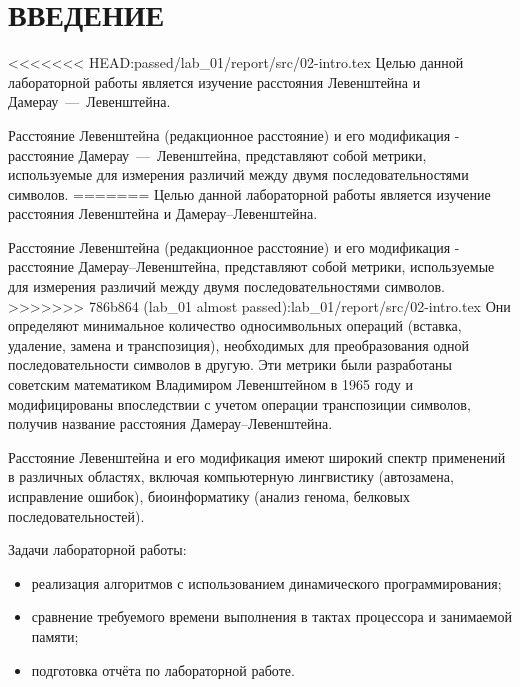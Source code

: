 \section*{ВВЕДЕНИЕ}

<<<<<<< HEAD:passed/lab_01/report/src/02-intro.tex
Целью данной лабораторной работы является изучение расстояния Левенштейна и Дамерау~---~Левенштейна.

Расстояние Левенштейна (редакционное расстояние) и его модификация - расстояние Дамерау~---~Левенштейна, представляют собой метрики, используемые для измерения различий между двумя последовательностями символов.
=======
Целью данной лабораторной работы является изучение расстояния Левенштейна и Дамерау--Левенштейна.

Расстояние Левенштейна (редакционное расстояние) и его модификация - расстояние Дамерау--Левенштейна, представляют собой метрики, используемые для измерения различий между двумя последовательностями символов.
>>>>>>> 786b864 (lab_01 almost passed):lab_01/report/src/02-intro.tex
Они определяют минимальное количество односимвольных операций (вставка, удаление, замена и транспозиция), необходимых для преобразования одной последовательности символов в другую.
Эти метрики были разработаны советским математиком Владимиром Левенштейном в 1965 году и модифицированы впоследствии с учетом операции транспозиции символов, получив название расстояния Дамерау--Левенштейна.

Расстояние Левенштейна и его модификация имеют широкий спектр применений в различных областях, включая компьютерную лингвистику (автозамена, исправление ошибок), биоинформатику (анализ генома, белковых последовательностей).

Задачи лабораторной работы:
\begin{itemize}
    \item реализация алгоритмов с использованием динамического программирования;
    \item сравнение требуемого времени выполнения в тактах процессора и занимаемой памяти;
    \item подготовка отчёта по лабораторной работе.
\end{itemize}

